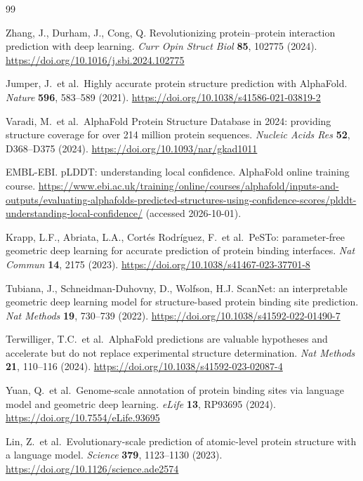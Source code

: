\documentclass[10pt]{article}
\begin{document}

\begin{thebibliography}{99}

 Zhang, J., Durham, J., Cong, Q. Revolutionizing
protein--protein interaction prediction with deep learning. \emph{Curr Opin
Struct Biol} \textbf{85}, 102775 (2024).
\url{https://doi.org/10.1016/j.sbi.2024.102775}

 Jumper, J.\ et al.\ Highly accurate protein structure
prediction with AlphaFold. \emph{Nature} \textbf{596}, 583--589 (2021).
\url{https://doi.org/10.1038/s41586-021-03819-2}

 Varadi, M.\ et al.\ AlphaFold Protein Structure Database
in 2024: providing structure coverage for over 214 million protein sequences.
\emph{Nucleic Acids Res} \textbf{52}, D368--D375 (2024).
\url{https://doi.org/10.1093/nar/gkad1011}

 EMBL-EBI. pLDDT: understanding local confidence.
AlphaFold online training course.
\url{https://www.ebi.ac.uk/training/online/courses/alphafold/inputs-and-outputs/evaluating-alphafolds-predicted-structures-using-confidence-scores/plddt-understanding-local-confidence/}
(accessed 2026-10-01).

 Krapp, L.F., Abriata, L.A., Cort\'es Rodr\'iguez, F.\ et
al.\ PeSTo: parameter-free geometric deep learning for accurate prediction of
protein binding interfaces. \emph{Nat Commun} \textbf{14}, 2175 (2023).
\url{https://doi.org/10.1038/s41467-023-37701-8}

 Tubiana, J., Schneidman-Duhovny, D., Wolfson, H.J.
ScanNet: an interpretable geometric deep learning model for structure-based
protein binding site prediction. \emph{Nat Methods} \textbf{19}, 730--739
(2022). \url{https://doi.org/10.1038/s41592-022-01490-7}

 Terwilliger, T.C.\ et al.\ AlphaFold predictions are
valuable hypotheses and accelerate but do not replace experimental structure
determination. \emph{Nat Methods} \textbf{21}, 110--116 (2024).
\url{https://doi.org/10.1038/s41592-023-02087-4}

 Yuan, Q.\ et al.\ Genome-scale annotation of protein
binding sites via language model and geometric deep learning. \emph{eLife}
\textbf{13}, RP93695 (2024). \url{https://doi.org/10.7554/eLife.93695}

 Lin, Z.\ et al.\ Evolutionary-scale prediction of
atomic-level protein structure with a language model. \emph{Science}
\textbf{379}, 1123--1130 (2023). \url{https://doi.org/10.1126/science.ade2574}


\end{thebibliography}
\end{document}
